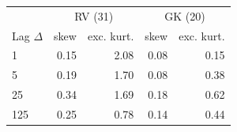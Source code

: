 \begin{tabular}{lrrrr}
\toprule
 & \multicolumn{2}{c}{RV (31)} & \multicolumn{2}{c}{GK (20)}\\
Lag $\Delta$ & skew & exc. kurt. & skew & exc. kurt.\\
\midrule
1 & 0.15 & 2.08 & 0.08 & 0.15\\
5 & 0.19 & 1.70 & 0.08 & 0.38\\
25 & 0.34 & 1.69 & 0.18 & 0.62\\
125 & 0.25 & 0.78 & 0.14 & 0.44\\
\bottomrule
\end{tabular}